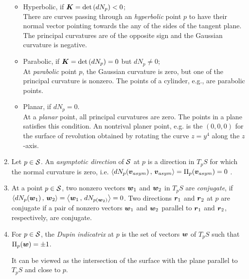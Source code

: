 \documentclass[11pt]{article}
\begin{document}
\begin{enumerate}
\begin{itemize}
\item Hyperbolic, if $\boldsymbol{K}=\det\left(dN_{p}\right) <0$;\\
There are curves passing through an \emph{hyperbolic} point $p$ to have their normal vector pointing towards the any of the sides of the tangent plane. The principal curvatures are of the opposite sign and the Gaussian curvature is negative. 


\item Parabolic, if  $\boldsymbol{K}=\det\left(dN_{p}\right) =0$ but $dN_{p}\neq 0$;\\
At \emph{parabolic} point $p$, the Gaussian curvature is zero, but one of the principal curvature is nonzero. The points of a cylinder, e.g., are parabolic points. 

\item Planar, if $dN_{p} = 0$.\\
At a \emph{planar} point, all principal curvatures are zero. The points in a plane satisfies this condition. An nontrival planer point, e.g. is the $(0,0,0)$ for the surface of revolution obtained by rotating the curve $z= y^{4}$ along the $z$-axis.   
\end{itemize}

\item Let $p\in {\mathcal S}$. An \emph{asymptotic direction} of ${\mathcal S}$ at $p$ is a direction in $T_{p}S$ for which the normal curvature is zero, i.e. $\left\langle dN_{p}(\boldsymbol{v}_{asym})\,,\, \boldsymbol{v}_{asym} \right\rangle = \Pi_{p}(\boldsymbol{v}_{asym})=0$ . 

\item At a point $p\in {\mathcal S}$, two nonzero vectors $\boldsymbol{w}_{1}$ and $\boldsymbol{w}_{2}$ in $T_{p}S$ are \emph{conjugate}, if $\left\langle dN_{p}(\boldsymbol{w}_{1})\,,\, \boldsymbol{w}_{2} \right\rangle = \left\langle \boldsymbol{w}_{1}\,,\, dN_{p(\boldsymbol{w}_{2})} \right\rangle = 0$. Two directions $\boldsymbol{r}_{1}$ and $\boldsymbol{r}_{2}$ at $p$ are conjugate if a pair of nonzero vectors  $\boldsymbol{w}_{1}$ and $\boldsymbol{w}_{2}$ parallel to $\boldsymbol{r}_{1}$ and $\boldsymbol{r}_{2}$, respectively, are conjugate. 

\item For $p\in {\mathcal S}$, the \emph{Dupin indicatrix} at $p$ is the set of vectors $\boldsymbol{w}$ of $T_{p}S$ such that $\Pi_{p}(\boldsymbol{w}) = \pm 1$.

It can be viewed as the intersection of the surface with the plane parallel to $T_{p}S$ and close to $p$.
\end{enumerate}
\end{document}
